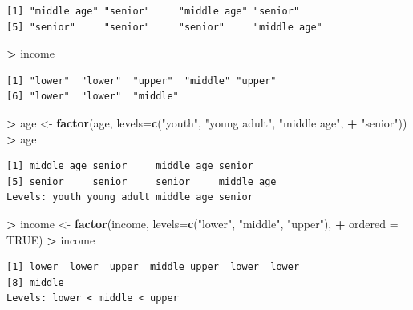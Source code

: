 \documentclass[]{krantz}
\makeatletter
\newenvironment{Shaded}{\begin{snugshade}}{\end{snugshade}}
\newcommand{\KeywordTok}[1]{\textcolor[rgb]{0.27,0.27,0.27}{\textbf{#1}}}
\newcommand{\DataTypeTok}[1]{\textcolor[rgb]{0.27,0.27,0.27}{#1}}
\newcommand{\StringTok}[1]{\textcolor[rgb]{0.5,0.5,0.5}{#1}}
\newcommand{\OtherTok}[1]{\textcolor[rgb]{0.37,0.37,0.37}{#1}}
\newcommand{\OperatorTok}[1]{\textcolor[rgb]{0.43,0.43,0.43}{\textbf{#1}}}
\newcommand{\NormalTok}[1]{#1}
\newenvironment{kframe}{%
\medskip{}
\setlength{\fboxsep}{.8em}
 \def\at@end@of@kframe{}%
 \ifinner\ifhmode%
  \def\at@end@of@kframe{\end{minipage}}%
  \begin{minipage}{\columnwidth}%
 \fi\fi%
 \def\FrameCommand##1{\hskip\@totalleftmargin \hskip-\fboxsep
 \colorbox{shadecolor}{##1}\hskip-\fboxsep
     \hskip-\linewidth \hskip-\@totalleftmargin \hskip\columnwidth}%
 \MakeFramed {\advance\hsize-\width
   \@totalleftmargin\z@ \linewidth\hsize
   \@setminipage}}%
 {\par\unskip\endMakeFramed%
 \at@end@of@kframe}
\renewenvironment{Shaded}{\begin{kframe}}{\end{kframe}}
\makeatother
\begin{document}
\begin{verbatim}
[1] "middle age" "senior"     "middle age" "senior"    
[5] "senior"     "senior"     "senior"     "middle age"
\end{verbatim}

\begin{Shaded}
\begin{Highlighting}[]
\OperatorTok{>}\StringTok{ }\NormalTok{income}
\end{Highlighting}
\end{Shaded}

\begin{verbatim}
[1] "lower"  "lower"  "upper"  "middle" "upper" 
[6] "lower"  "lower"  "middle"
\end{verbatim}

\begin{Shaded}
\begin{Highlighting}[]
\OperatorTok{>}\StringTok{ }\NormalTok{age <-}\StringTok{ }\KeywordTok{factor}\NormalTok{(age, }\DataTypeTok{levels=}\KeywordTok{c}\NormalTok{(}\StringTok{"youth"}\NormalTok{, }\StringTok{"young adult"}\NormalTok{, }\StringTok{"middle age"}\NormalTok{,}
\OperatorTok{+}\StringTok{                             "senior"}\NormalTok{))}
\OperatorTok{>}\StringTok{ }\NormalTok{age}
\end{Highlighting}
\end{Shaded}

\begin{verbatim}
[1] middle age senior     middle age senior    
[5] senior     senior     senior     middle age
Levels: youth young adult middle age senior
\end{verbatim}

\begin{Shaded}
\begin{Highlighting}[]
\OperatorTok{>}\StringTok{ }\NormalTok{income <-}\StringTok{ }\KeywordTok{factor}\NormalTok{(income, }\DataTypeTok{levels=}\KeywordTok{c}\NormalTok{(}\StringTok{"lower"}\NormalTok{, }\StringTok{"middle"}\NormalTok{, }\StringTok{"upper"}\NormalTok{),}
\OperatorTok{+}\StringTok{                  }\DataTypeTok{ordered =} \OtherTok{TRUE}\NormalTok{)}
\OperatorTok{>}\StringTok{ }\NormalTok{income}
\end{Highlighting}
\end{Shaded}

\begin{verbatim}
[1] lower  lower  upper  middle upper  lower  lower 
[8] middle
Levels: lower < middle < upper
\end{verbatim}
\end{document}
